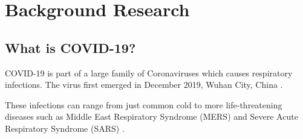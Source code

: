 \section{Background Research}
  \citetrackerfalse

  \subsection{What is COVID-19?}
    \par COVID-19 is part of a large family of Coronaviruses which causes respiratory infections. The virus first emerged in December 2019, Wuhan City, China \parencite{HealthGovAU}.
    \par These infections can range from just common cold to more life-threatening diseases such as Middle East Respiratory Syndrome (MERS) and Severe Acute Respiratory Syndrome (SARS) \parencite{Q&A_WHO}.

